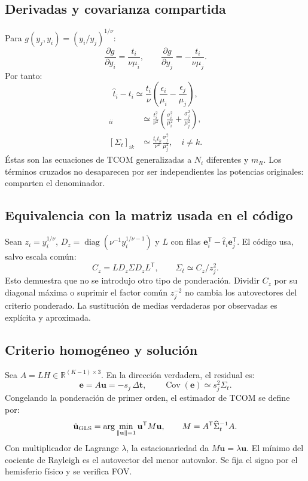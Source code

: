 \documentclass[11pt,a4paper]{article}
\begin{document}
\subsection{Derivadas y covarianza compartida}
Para $g(y_j,y_i)=(y_i/y_j)^{1/\nu}$:
\begin{equation}
 \frac{\partial g}{\partial y_i}=\frac{t_i}{\nu\mu_i},\qquad
 \frac{\partial g}{\partial y_j}=-\frac{t_i}{\nu\mu_j}.
\end{equation}
Por tanto:
\begin{equation}
 \hat t_i-t_i\simeq\frac{t_i}{\nu}\left(\frac{\epsilon_i}{\mu_i}-\frac{\epsilon_j}{\mu_j}\right),
\end{equation}
\begin{align}
 [\Sigma_t]_{ii}&\simeq\frac{t_i^2}{\nu^2}\left(\frac{\sigma_i^2}{\mu_i^2}+\frac{\sigma_j^2}{\mu_j^2}\right),\\
 [\Sigma_t]_{ik}&\simeq\frac{t_it_k}{\nu^2}\frac{\sigma_j^2}{\mu_j^2},\quad i\ne k.
\label{eq:ratio_covariance}
\end{align}
Éstas son las ecuaciones de TCOM generalizadas a $N_i$ diferentes y $m_R$. Los términos cruzados no desaparecen por ser independientes las potencias originales: comparten el denominador.

\subsection{Equivalencia con la matriz usada en el código}
Sean $z_i=y_i^{1/\nu}$, $D_z=\operatorname{diag}(\nu^{-1}y_i^{1/\nu-1})$ y $L$ con filas $\mathbf e_i^{\mathsf T}-\hat t_i\mathbf e_j^{\mathsf T}$. El código usa, salvo escala común:
\begin{equation}
 C_z=LD_z\Sigma D_zL^{\mathsf T},\qquad \Sigma_t\simeq C_z/z_j^2.
\end{equation}
Esto demuestra que no se introdujo otro tipo de ponderación. Dividir $C_z$ por su diagonal máxima o suprimir el factor común $z_j^{-2}$ no cambia los autovectores del criterio ponderado. La sustitución de medias verdaderas por observadas es explícita y aproximada.

\subsection{Criterio homogéneo y solución}
Sea $A=LH\in\mathbb R^{(K-1)\times3}$. En la dirección verdadera, el residual es:
\begin{equation}
 \mathbf e=A\mathbf u=-s_j\,\Delta\mathbf t,\qquad
 \operatorname{Cov}(\mathbf e)\simeq s_j^2\Sigma_t.
\end{equation}
Congelando la ponderación de primer orden, el estimador de TCOM se define por:
\begin{equation}
 \hat{\mathbf u}_{\rm GLS}=\arg\min_{\|\mathbf u\|=1}\mathbf u^{\mathsf T}M\mathbf u,
 \qquad M=A^{\mathsf T}\widehat\Sigma_t^{-1}A.
\end{equation}
Con multiplicador de Lagrange $\lambda$, la estacionariedad da $M\mathbf u=\lambda\mathbf u$. El mínimo del cociente de Rayleigh es el autovector del menor autovalor. Se fija el signo por el hemisferio físico y se verifica FOV.
\end{document}
